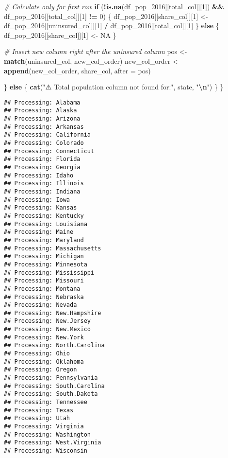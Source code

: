 \documentclass[
]{article}
\newenvironment{Shaded}{\begin{snugshade}}{\end{snugshade}}
\newcommand{\AttributeTok}[1]{\textcolor[rgb]{0.13,0.29,0.53}{#1}}
\newcommand{\CommentTok}[1]{\textcolor[rgb]{0.56,0.35,0.01}{\textit{#1}}}
\newcommand{\ConstantTok}[1]{\textcolor[rgb]{0.56,0.35,0.01}{#1}}
\newcommand{\ControlFlowTok}[1]{\textcolor[rgb]{0.13,0.29,0.53}{\textbf{#1}}}
\newcommand{\DecValTok}[1]{\textcolor[rgb]{0.00,0.00,0.81}{#1}}
\newcommand{\FunctionTok}[1]{\textcolor[rgb]{0.13,0.29,0.53}{\textbf{#1}}}
\newcommand{\NormalTok}[1]{#1}
\newcommand{\OtherTok}[1]{\textcolor[rgb]{0.56,0.35,0.01}{#1}}
\newcommand{\SpecialCharTok}[1]{\textcolor[rgb]{0.81,0.36,0.00}{\textbf{#1}}}
\newcommand{\StringTok}[1]{\textcolor[rgb]{0.31,0.60,0.02}{#1}}
\begin{document}
\begin{Shaded}
\begin{Highlighting}[]
    \CommentTok{\# Calculate only for first row}
    \ControlFlowTok{if}\NormalTok{ (}\SpecialCharTok{!}\FunctionTok{is.na}\NormalTok{(df\_pop\_2016[[total\_col]][}\DecValTok{1}\NormalTok{]) }\SpecialCharTok{\&\&}\NormalTok{ df\_pop\_2016[[total\_col]][}\DecValTok{1}\NormalTok{] }\SpecialCharTok{!=} \DecValTok{0}\NormalTok{) \{}
\NormalTok{      df\_pop\_2016[[share\_col]][}\DecValTok{1}\NormalTok{] }\OtherTok{\textless{}{-}}\NormalTok{ df\_pop\_2016[[uninsured\_col]][}\DecValTok{1}\NormalTok{] }\SpecialCharTok{/}\NormalTok{ df\_pop\_2016[[total\_col]][}\DecValTok{1}\NormalTok{]}
\NormalTok{    \} }\ControlFlowTok{else}\NormalTok{ \{}
\NormalTok{      df\_pop\_2016[[share\_col]][}\DecValTok{1}\NormalTok{] }\OtherTok{\textless{}{-}} \ConstantTok{NA}
\NormalTok{    \}}
    
    \CommentTok{\# Insert new column right after the uninsured column}
\NormalTok{    pos }\OtherTok{\textless{}{-}} \FunctionTok{match}\NormalTok{(uninsured\_col, new\_col\_order)}
\NormalTok{    new\_col\_order }\OtherTok{\textless{}{-}} \FunctionTok{append}\NormalTok{(new\_col\_order, share\_col, }\AttributeTok{after =}\NormalTok{ pos)}
    
\NormalTok{  \} }\ControlFlowTok{else}\NormalTok{ \{}
    \FunctionTok{cat}\NormalTok{(}\StringTok{"⚠️ Total population column not found for:"}\NormalTok{, state, }\StringTok{"}\SpecialCharTok{\textbackslash{}n}\StringTok{"}\NormalTok{)}
\NormalTok{  \}}
\NormalTok{\}}
\end{Highlighting}
\end{Shaded}

\begin{verbatim}
## Processing: Alabama 
## Processing: Alaska 
## Processing: Arizona 
## Processing: Arkansas 
## Processing: California 
## Processing: Colorado 
## Processing: Connecticut 
## Processing: Florida 
## Processing: Georgia 
## Processing: Idaho 
## Processing: Illinois 
## Processing: Indiana 
## Processing: Iowa 
## Processing: Kansas 
## Processing: Kentucky 
## Processing: Louisiana 
## Processing: Maine 
## Processing: Maryland 
## Processing: Massachusetts 
## Processing: Michigan 
## Processing: Minnesota 
## Processing: Mississippi 
## Processing: Missouri 
## Processing: Montana 
## Processing: Nebraska 
## Processing: Nevada 
## Processing: New.Hampshire 
## Processing: New.Jersey 
## Processing: New.Mexico 
## Processing: New.York 
## Processing: North.Carolina 
## Processing: Ohio 
## Processing: Oklahoma 
## Processing: Oregon 
## Processing: Pennsylvania 
## Processing: South.Carolina 
## Processing: South.Dakota 
## Processing: Tennessee 
## Processing: Texas 
## Processing: Utah 
## Processing: Virginia 
## Processing: Washington 
## Processing: West.Virginia 
## Processing: Wisconsin
\end{verbatim}
\end{document}

